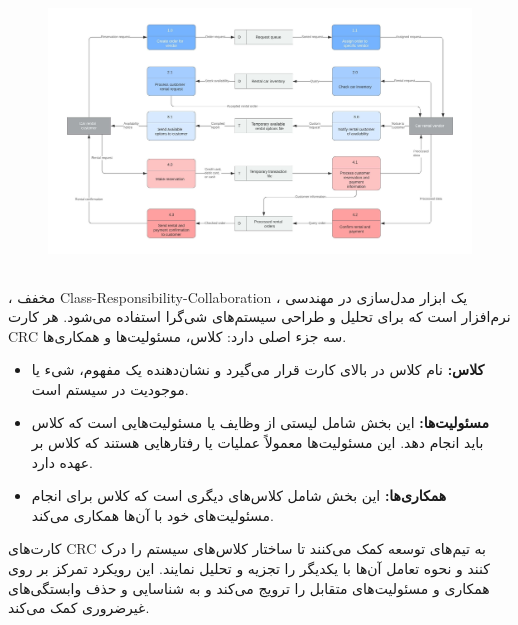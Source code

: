 \begin{figure}[H]
	\centering
	\includegraphics{pic8.png}
	\label{fig:label4}
\end{figure}

\subsection*{}

 ، مخفف Class-Responsibility-Collaboration ، یک ابزار مدل‌سازی در مهندسی نرم‌افزار است که برای تحلیل و طراحی سیستم‌های شی‌گرا استفاده می‌شود. هر کارت CRC سه جزء اصلی دارد: کلاس، مسئولیت‌ها و همکاری‌ها.

\begin{itemize}
	\item \textbf{کلاس:} نام کلاس در بالای کارت قرار می‌گیرد و نشان‌دهنده یک مفهوم، شیء یا موجودیت در سیستم است.
	\item \textbf{مسئولیت‌ها:} این بخش شامل لیستی از وظایف یا مسئولیت‌هایی است که کلاس باید انجام دهد. این مسئولیت‌ها معمولاً عملیات یا رفتارهایی هستند که کلاس بر عهده دارد.
	\item \textbf{همکاری‌ها:} این بخش شامل کلاس‌های دیگری است که کلاس برای انجام مسئولیت‌های خود با آن‌ها همکاری می‌کند.
\end{itemize}

کارت‌های CRC به تیم‌های توسعه کمک می‌کنند تا ساختار کلاس‌های سیستم را درک کنند و نحوه تعامل آن‌ها با یکدیگر را تجزیه و تحلیل نمایند. این رویکرد تمرکز بر روی همکاری و مسئولیت‌های متقابل را ترویج می‌کند و به شناسایی و حذف وابستگی‌های غیرضروری کمک می‌کند.

